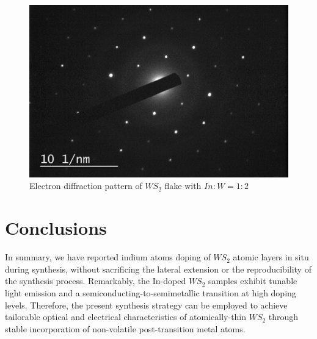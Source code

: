 \begin{figure}[H]
	\begin{center}
		\includegraphics[scale=0.4]{In/TEMED.png}
		\caption{Electron diffraction pattern of $WS_2$ flake with $In:W = 1:2$}
		\label{fig:InTEMED}
	\end{center}
\end{figure}

\section{Conclusions}

In summary, we have reported indium atoms doping of $WS_2$ atomic layers in situ during synthesis, without sacrificing the lateral extension or the reproducibility of the synthesis process. Remarkably, the In-doped $WS_2$ samples exhibit tunable light emission and a semiconducting-to-semimetallic transition at high doping levels. Therefore, the present synthesis strategy can be employed to achieve tailorable optical and electrical characteristics of atomically-thin $WS_2$ through stable incorporation of non-volatile post-transition metal atoms.